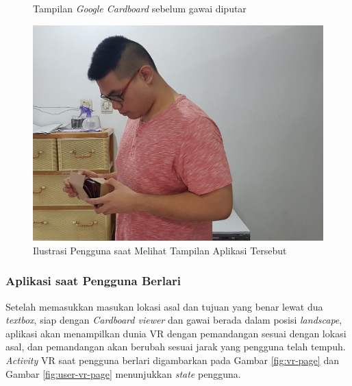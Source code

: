 \begin{figure}
    \caption{Tampilan \textit{Google Cardboard} sebelum gawai diputar}
    \label{fig:cardboard-page}
\endminipage\hfill
{}
  \includegraphics[width=\linewidth]{Gambar/richard-vr-setup.jpg}
  \caption{Ilustrasi Pengguna saat Melihat Tampilan Aplikasi Tersebut}
  \label{fig:user-transition-page}
\endminipage\hfill
\end{figure}

\subsubsection{Aplikasi saat Pengguna Berlari}
Setelah memasukkan masukan lokasi asal dan tujuan yang benar lewat dua \textit{textbox}, siap dengan \textit{Cardboard viewer} dan gawai berada dalam posisi \textit{landscape},  aplikasi akan menampilkan dunia VR dengan pemandangan sesuai dengan lokasi asal, dan pemandangan akan berubah sesuai jarak yang pengguna telah tempuh. \textit{Activity} VR saat pengguna berlari digambarkan pada Gambar \ref{fig:vr-page} dan Gambar \ref{fig:user-vr-page} menunjukkan \textit{state} pengguna.

